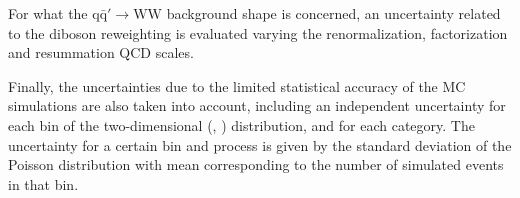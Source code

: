 For what the $\mathrm{q\bar{q}'\to WW}$ background shape is concerned, an uncertainty related to the diboson \pt reweighting is evaluated varying the renormalization, factorization and resummation QCD scales.

Finally, the uncertainties due to the limited statistical accuracy of the MC simulations are also taken into account, including an independent uncertainty for each bin of the two-dimensional  (\mll, \mt) distribution, and for each category. The uncertainty for a certain bin and process is given by the standard deviation of the Poisson distribution with mean corresponding to the number of simulated events in that bin.

 
